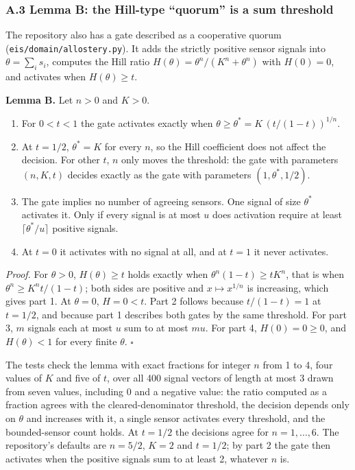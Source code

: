 \documentclass[
  11pt,
]{article}
\providecommand{\tightlist}{%
  \setlength{\itemsep}{0pt}\setlength{\parskip}{0pt}}
\begin{document}
\subsubsection{A.3 Lemma B: the Hill-type ``quorum'' is a sum
threshold}\label{a.3-lemma-b-the-hill-type-quorum-is-a-sum-threshold}

The repository also has a gate described as a cooperative quorum
(\nolinkurl{eis/domain/allostery.py}).
It adds the strictly positive sensor signals into
\(\theta = \sum_i s_i\), computes the Hill ratio
\(H(\theta) = \theta^n / (K^n + \theta^n)\) with \(H(0) = 0\), and
activates when \(H(\theta) \geq t\).

\textbf{Lemma B.} Let \(n > 0\) and \(K > 0\).

\begin{enumerate}
\def\labelenumi{\arabic{enumi}.}
\tightlist
\item
  For \(0 < t < 1\) the gate activates exactly when
  \(\theta \geq \theta^* = K \, (t / (1 - t))^{1/n}\).
\item
  At \(t = 1/2\), \(\theta^* = K\) for every \(n\), so the Hill
  coefficient does not affect the decision. For other \(t\), \(n\) only
  moves the threshold: the gate with parameters \((n, K, t)\) decides
  exactly as the gate with parameters \((1, \theta^*, 1/2)\).
\item
  The gate implies no number of agreeing sensors. One signal of size
  \(\theta^*\) activates it. Only if every signal is at most \(u\) does
  activation require at least \(\lceil \theta^* / u \rceil\) positive
  signals.
\item
  At \(t = 0\) it activates with no signal at all, and at \(t = 1\) it
  never activates.
\end{enumerate}

\emph{Proof.} For \(\theta > 0\), \(H(\theta) \geq t\) holds exactly
when \(\theta^n (1 - t) \geq t K^n\), that is when
\(\theta^n \geq K^n t / (1 - t)\); both sides are positive and
\(x \mapsto x^{1/n}\) is increasing, which gives part 1. At
\(\theta = 0\), \(H = 0 < t\). Part 2 follows because
\(t / (1 - t) = 1\) at \(t = 1/2\), and because part 1 describes both
gates by the same threshold. For part 3, \(m\) signals each at most
\(u\) sum to at most \(mu\). For part 4, \(H(0) = 0 \geq 0\), and
\(H(\theta) < 1\) for every finite \(\theta\). \(\square\)

The tests check the lemma with exact fractions for integer \(n\) from 1
to 4, four values of \(K\) and five of \(t\), over all 400 signal
vectors of length at most 3 drawn from seven values, including 0 and a
negative value: the ratio computed as a fraction agrees with the
cleared-denominator threshold, the decision depends only on \(\theta\)
and increases with it, a single sensor activates every threshold, and
the bounded-sensor count holds. At \(t = 1/2\) the decisions agree for
\(n = 1, \ldots, 6\). The repository's defaults are \(n = 5/2\),
\(K = 2\) and \(t = 1/2\); by part 2 the gate then activates when the
positive signals sum to at least 2, whatever \(n\) is.
\end{document}
